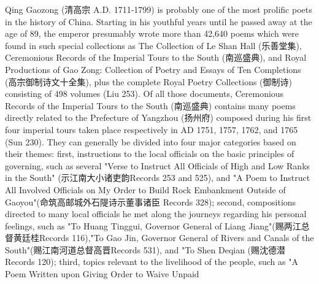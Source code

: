 \noindent Qing Gaozong (清高宗 A.D. 1711-1799) is probably one of the most prolific poets in the history of China. Starting in his youthful years until he passed away at the age of 89, the emperor presumably wrote more than 42,640 poems which were found in such special collections as The Collection of Le Shan Hall (乐善堂集), Ceremonious Records of the Imperial Tours to the South (南巡盛典), and Royal Productions of Gao Zong: Collection of Poetry and Essays of Ten Completions (高宗御制诗文十全集), plus the complete Royal Poetry Collections (御制诗) consisting of 498 volumes (Liu 253). Of all those documents, Ceremonious Records of the Imperial Tours to the South (南巡盛典) contains many poems directly related to the Prefecture of Yangzhou (扬州府) composed during his first four imperial tours taken place respectively in AD 1751, 1757, 1762, and 1765 (Sun 230). They can generally be divided into four major categories based on their themes: first, instructions to the local officials on the basic principles of governing, such as several "Verse to Instruct All Officials of High and Low Ranks in the South" (示江南大小诸吏韵Records 253 and 525), and "A Poem to Instruct All Involved Officials on My Order to Build Rock Embankment Outside of Gaoyou"(命筑高邮城外石隄诗示董事诸臣 Records 328); second, compositions directed to many local officials he met along the journeys regarding his personal feelings, such as "To Huang Tinggui, Governor General of Liang Jiang"(赐两江总督黄廷桂Records 116),"To Gao Jin, Governor General of Rivers and Canals of the South"(赐江南河道总督高晋Records 531), and "To Shen Deqian (赐沈德潜 Records 120); third, topics relevant to the livelihood of the people, such as "A Poem Written upon Giving Order to Waive Unpaid

\vfill
\begin{BookNotes}
\end{BookNotes}

